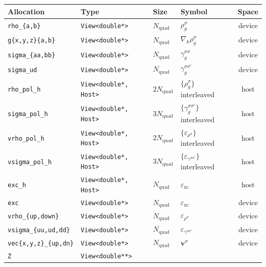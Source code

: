 \documentclass{article}
\begin{document}
\begin{table}[H]
  \centering
  {\small
    \begin{tabular}{@{}llllc@{}}
      \toprule
      Allocation & Type & Size & Symbol & Space \\
      \midrule
      \texttt{rho\_\{a,b\}}         & \texttt{View<double*>}
      & $N_\text{quad}$ & $\rho^\sigma_g$ & device \\
      \texttt{g\{x,y,z\}\{a,b\}}    & \texttt{View<double*>}
      & $N_\text{quad}$ & $\nabla_k\rho^\sigma_g$ & device \\
      \texttt{sigma\_\{aa,bb\}}     & \texttt{View<double*>}
      & $N_\text{quad}$ & $\gamma^{\sigma\sigma}_g$ & device \\
      \texttt{sigma\_ud}            & \texttt{View<double*>}
      & $N_\text{quad}$ & $\gamma^{\sigma\sigma'}_g$ & device \\
      \midrule
      \texttt{rho\_pol\_h}          & \texttt{View<double*, Host>}
      & $2N_\text{quad}$ & $\{\rho^\sigma_g\}$ interleaved & host \\
      \texttt{sigma\_pol\_h}        & \texttt{View<double*, Host>}
      & $3N_\text{quad}$ & $\{\gamma^{\sigma\sigma'}_g\}$ interleaved & host \\
      \texttt{vrho\_pol\_h}         & \texttt{View<double*, Host>}
      & $2N_\text{quad}$ & $\{\varepsilon_{\rho^\sigma}\}$ interleaved & host \\
      \texttt{vsigma\_pol\_h}       & \texttt{View<double*, Host>}
      & $3N_\text{quad}$
      & $\{\varepsilon_{\gamma^{\sigma\sigma'}}\}$ interleaved & host \\
      \texttt{exc\_h}               & \texttt{View<double*, Host>}
      & $N_\text{quad}$ & $\varepsilon_\text{xc}$ & host \\
      \midrule
      \texttt{exc}                  & \texttt{View<double*>}
      & $N_\text{quad}$ & $\varepsilon_\text{xc}$ & device \\
      \texttt{vrho\_\{up,down\}}    & \texttt{View<double*>}
      & $N_\text{quad}$ & $\varepsilon_{\rho^\sigma}$ & device \\
      \texttt{vsigma\_\{uu,ud,dd\}} & \texttt{View<double*>}
      & $N_\text{quad}$ & $\varepsilon_{\gamma^{\sigma\sigma'}}$ & device \\
      \texttt{vec\{x,y,z\}\_\{up,dn\}} & \texttt{View<double*>}
      & $N_\text{quad}$ & $\mathbf v^\sigma$ & device \\
      \midrule
      \texttt{Z}                    & \texttt{View<double**>}

\end{tabular}}
\end{table}
\end{document}
